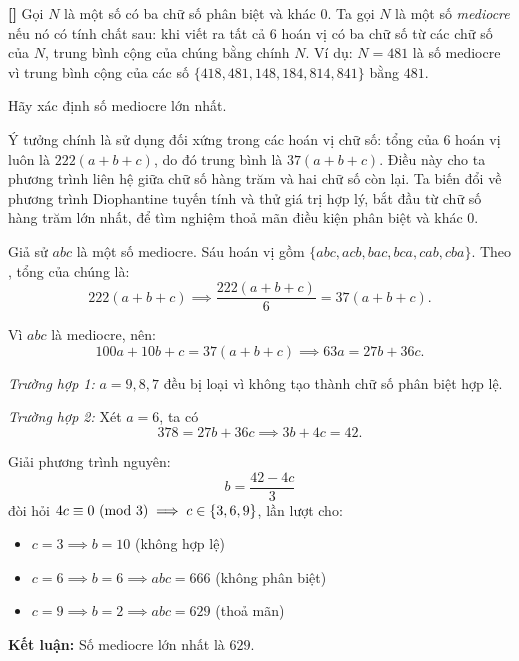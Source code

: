 \documentclass[../01-divisibility.tex]{subfiles}
\begin{document}
\begin{example*}\label{example:CAN-2015-QRC-P3}\textbf{[]}
	Gọi \( N \) là một số có ba chữ số phân biệt và khác 0. Ta gọi \( N \) là một số \textit{mediocre} nếu nó có tính chất sau:
	khi viết ra tất cả 6 hoán vị có ba chữ số từ các chữ số của \( N \), trung bình cộng của chúng bằng chính \( N \).
	Ví dụ: \( N = 481 \) là số mediocre vì trung bình cộng của các số \( \{418, 481, 148, 184, 814, 841\} \) bằng \( 481 \).

	Hãy xác định số mediocre lớn nhất.	
\end{example*}

\begin{story*}
	Ý tưởng chính là sử dụng đối xứng trong các hoán vị chữ số: tổng của 6 hoán vị luôn là \( 222(a + b + c) \), do đó trung bình là \( 37(a + b + c) \).  
	Điều này cho ta phương trình liên hệ giữa chữ số hàng trăm và hai chữ số còn lại. Ta biến đổi về phương trình Diophantine tuyến tính và thử giá trị hợp lý, bắt đầu từ chữ số hàng trăm lớn nhất, để tìm nghiệm thoả mãn điều kiện phân biệt và khác 0.
\end{story*}

\begin{soln}\footnotemark
	Giả sử \( abc \) là một số mediocre. Sáu hoán vị gồm \( \{abc, acb, bac, bca, cab, cba\} \). Theo , tổng của chúng là:
	\[
		222(a + b + c) \implies \frac{222(a + b + c)}{6} = 37(a + b + c).
	\]
	
	Vì \( abc \) là mediocre, nên:
	\[
		100a + 10b + c = 37(a + b + c) \implies 63a = 27b + 36c.
	\]

	\textit{Trường hợp 1:} \( a = 9, 8, 7 \) đều bị loại vì không tạo thành chữ số phân biệt hợp lệ.

	\textit{Trường hợp 2:} Xét \( a = 6 \), ta có
	\[
		378 = 27b + 36c \implies 3b + 4c = 42.
	\]

	Giải phương trình nguyên:
	\[
		b = \frac{42 - 4c}{3}
	\]
	đòi hỏi \( 4c \equiv 0 \ (\mathrm{mod}\ 3) \implies c \in \{3, 6, 9\} \), lần lượt cho:
	\begin{itemize}[topsep=0pt, partopsep=0pt, itemsep=0pt]
	    \item \( c = 3 \implies b = 10 \) (không hợp lệ)
	    \item \( c = 6 \implies b = 6 \implies abc = 666 \) (không phân biệt)
	    \item \( c = 9 \implies b = 2 \implies abc = 629 \) (thoả mãn)
	\end{itemize}

	\textbf{Kết luận:} Số mediocre lớn nhất là \( \boxed{629} \).
\end{soln}

\end{document}
